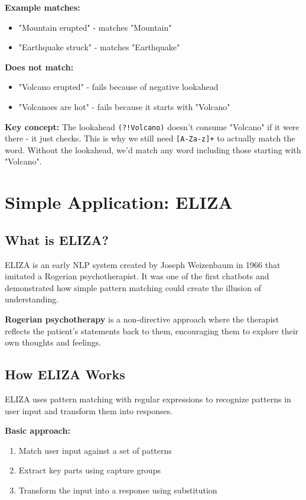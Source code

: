 \documentclass[11pt,a4paper]{article}
\theoremstyle{definition}
\theoremstyle{plain}
\theoremstyle{remark}
\begin{document}
\textbf{Example matches:}
\begin{itemize}
    \item "Mountain erupted" - matches "Mountain"
    \item "Earthquake struck" - matches "Earthquake"
\end{itemize}

\textbf{Does not match:}
\begin{itemize}
    \item "Volcano erupted" - fails because of negative lookahead
    \item "Volcanoes are hot" - fails because it starts with "Volcano"
\end{itemize}

\textbf{Key concept:} The lookahead \texttt{(?!Volcano)} doesn't consume "Volcano" if it were there - it just checks. This is why we still need \texttt{[A-Za-z]+} to actually match the word. Without the lookahead, we'd match any word including those starting with "Volcano".

\section{Simple Application: ELIZA}

\subsection{What is ELIZA?}

ELIZA is an early NLP system created by Joseph Weizenbaum in 1966 that imitated a Rogerian psychotherapist. It was one of the first chatbots and demonstrated how simple pattern matching could create the illusion of understanding.

\textbf{Rogerian psychotherapy} is a non-directive approach where the therapist reflects the patient's statements back to them, encouraging them to explore their own thoughts and feelings.

\subsection{How ELIZA Works}

ELIZA uses pattern matching with regular expressions to recognize patterns in user input and transform them into responses.

\textbf{Basic approach:}
\begin{enumerate}
    \item Match user input against a set of patterns
    \item Extract key parts using capture groups
    \item Transform the input into a response using substitution
\end{enumerate}
\end{document}
